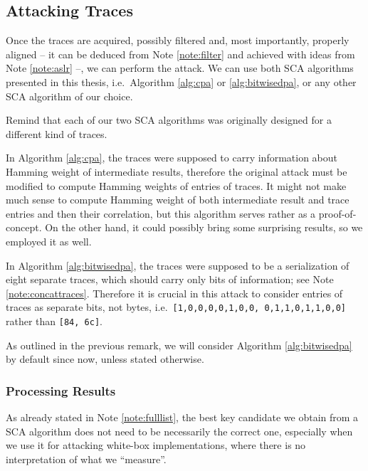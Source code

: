 
\subsection{Attacking Traces}
\label{sec:attack}

Once the traces are acquired, possibly filtered and, most importantly, properly aligned -- it can be deduced from Note \ref{note:filter} and achieved with ideas from Note \ref{note:aslr} --, we can perform the attack. We can use both SCA algorithms presented in this thesis, i.e.\ Algorithm \ref{alg:cpa} or \ref{alg:bitwisedpa}, or any other SCA algorithm of our choice.

\begin{remark}
\label{rem:traceformat}
	Remind that each of our two SCA algorithms was originally designed for a different kind of traces.
	
	In Algorithm \ref{alg:cpa}, the traces were supposed to carry information about Hamming weight of intermediate results, therefore the original attack must be modified to compute Hamming weights of entries of traces. It might not make much sense to compute Hamming weight of both intermediate result and trace entries and then their correlation, but this algorithm serves rather as a proof-of-concept. On the other hand, it could possibly bring some surprising results, so we employed it as well.
	
	In Algorithm \ref{alg:bitwisedpa}, the traces were supposed to be a serialization of eight separate traces, which should carry only bits of information; see Note \ref{note:concattraces}. Therefore it is crucial in this attack to consider entries of traces as separate bits, not bytes, i.e.\ {\tt [1,0,0,0,0,1,0,0, 0,1,1,0,1,1,0,0]} rather than {\tt [84, 6c]}.
\end{remark}

As outlined in the previous remark, we will consider Algorithm \ref{alg:bitwisedpa} by default since now, unless stated otherwise.

\subsubsection{Processing Results}
	
	As already stated in Note \ref{note:fulllist}, the best key candidate we obtain from a SCA algorithm does not need to be necessarily the correct one, especially when we use it for attacking white-box implementations, where there is no interpretation of what we ``measure''.
	
